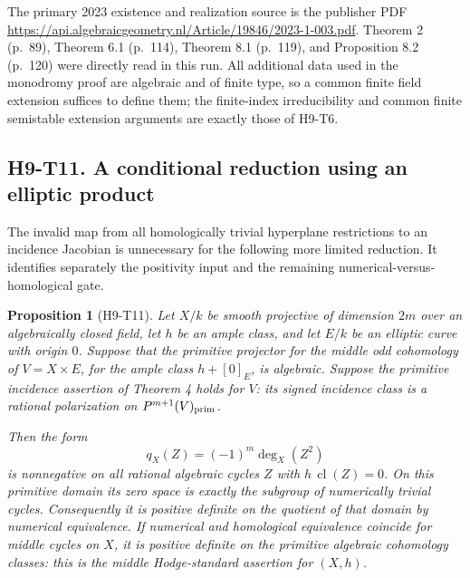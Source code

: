 \documentclass[11pt,a4paper]{article}
\newtheorem{proposition}[theorem]{Proposition}
\begin{document}
The primary 2023 existence and realization source is the publisher PDF
\url{https://api.algebraicgeometry.nl/Article/19846/2023-1-003.pdf}.
Theorem 2 (p.~89), Theorem 6.1 (p.~114), Theorem 8.1 (p.~119), and
Proposition 8.2 (p.~120) were directly read in this run. All additional
data used in the monodromy proof are algebraic and of finite type, so
a common finite field extension suffices to define them; the
finite-index irreducibility and common finite semistable extension
arguments are exactly those of H9-T6.



\subsection*{H9-T11. A conditional reduction using an elliptic product}

The invalid map from all homologically trivial hyperplane restrictions
to an incidence Jacobian is unnecessary for the following more limited
reduction. It identifies separately the positivity input and the remaining
numerical-versus-homological gate.

\begin{proposition}[H9-T11]
Let $X/k$ be smooth projective of dimension $2m$ over an algebraically
closed field, let $h$ be an ample class, and let $E/k$ be an elliptic
curve with origin $0$. Suppose that the primitive projector for the
middle odd cohomology of $V=X\times E$, for the ample class
$h+[0]_E$, is algebraic. Suppose the primitive incidence assertion of
Theorem 4 holds for $V$: its signed incidence class is a rational
polarization on $P^{m+1}(V)_{\rm prim}$.

Then the form
\[
 q_X(Z)=(-1)^m\deg_X(Z^2)
\]
is nonnegative on all rational algebraic cycles $Z$ with
$h\,\operatorname{cl}(Z)=0$. On this primitive domain its zero space
is exactly the subgroup of numerically trivial cycles. Consequently
it is positive definite on the quotient of that domain by numerical
equivalence. If numerical and homological equivalence coincide for
middle cycles on $X$, it is positive definite on the primitive
algebraic cohomology classes: this is the middle Hodge-standard
assertion for $(X,h)$.
\end{proposition}
\end{document}
